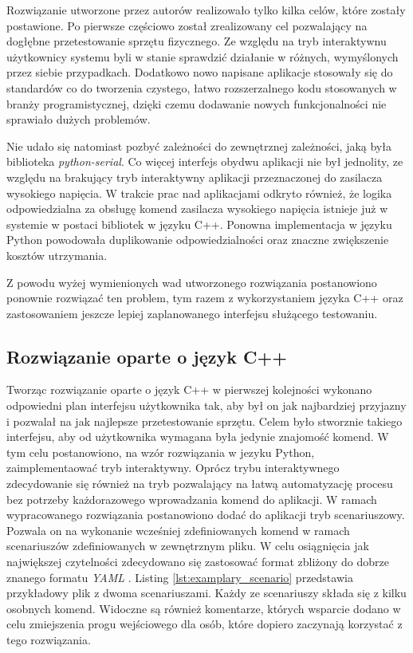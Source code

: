 Rozwiązanie utworzone przez autorów realizowało tylko kilka celów, które zostały postawione. Po pierwsze częściowo został zrealizowany cel pozwalający na dogłębne przetestowanie sprzętu fizycznego. Ze względu na tryb interaktywnu użytkownicy systemu byli w stanie sprawdzić działanie w różnych, wymyślonych przez siebie przypadkach. Dodatkowo nowo napisane aplikacje stosowały się do standardów co do tworzenia czystego, łatwo rozszerzalnego kodu stosowanych w branży programistycznej, dzięki czemu dodawanie nowych funkcjonalności nie sprawiało dużych problemów.

Nie udało się natomiast pozbyć zależności do zewnętrznej zależności, jaką była biblioteka \emph{python-serial}. Co więcej interfejs obydwu aplikacji nie był jednolity, ze względu na brakujący tryb interaktywny aplikacji przeznaczonej do zasilacza wysokiego napięcia. W trakcie prac nad aplikacjami odkryto również, że logika odpowiedzialna za obsługę komend zasilacza wysokiego napięcia istnieje już w systemie w postaci bibliotek w języku C++. Ponowna implementacja w języku Python powodowała duplikowanie odpowiedzialności oraz znaczne zwiększenie kosztów utrzymania.

Z powodu wyżej wymienionych wad utworzonego rozwiązania postanowiono ponownie rozwiązać ten problem, tym razem z wykorzystaniem języka C++ oraz zastosowaniem jeszcze lepiej zaplanowanego interfejsu służącego testowaniu.

\subsection{Rozwiązanie oparte o język C++}

Tworząc rozwiązanie oparte o język C++ w pierwszej kolejności wykonano odpowiedni plan interfejsu użytkownika tak, aby był on jak najbardziej przyjazny i pozwalał na jak najlepsze przetestowanie sprzętu. Celem było stworznie takiego interfejsu, aby od użytkownika wymagana była jedynie znajomość komend. W tym celu postanowiono, na wzór rozwiązania w jezyku Python, zaimplementaować tryb interaktywny. Oprócz trybu interaktywnego zdecydowanie się również na tryb pozwalający na łatwą automatyzację procesu bez potrzeby każdorazowego wprowadzania komend do aplikacji. W ramach wypracowanego rozwiązania postanowiono dodać do aplikacji tryb scenariuszowy. Pozwala on na wykonanie wcześniej zdefiniowanych komend w ramach scenariuszów zdefiniowanych w zewnętrznym pliku. W celu osiągnięcia jak największej czytelności zdecydowano się zastosować format zbliżony do dobrze znanego formatu \emph{YAML} \cite{yaml}. Listing \ref{lst:examplary_scenario} przedstawia przykładowy plik z dwoma scenariuszami. Każdy ze scenariuszy składa się z kilku osobnych komend. Widoczne są również komentarze, których wsparcie dodano w celu zmiejszenia progu wejściowego dla osób, które dopiero zaczynają korzystać z tego rozwiązania.

